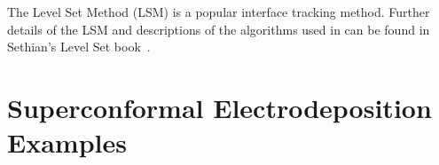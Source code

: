 \documentclass[letterpaper,twoside,openright,10pt]{memoir}
\begin{document}
The Level Set Method (LSM) is a popular interface tracking
method. Further details of the LSM and descriptions of the algorithms
used in \FiPy{} can be found in Sethian's Level Set
book~\cite{levelSetBook}.


% 

% 



\newpage
\section*{Superconformal Electrodeposition Examples}








\end{document}

